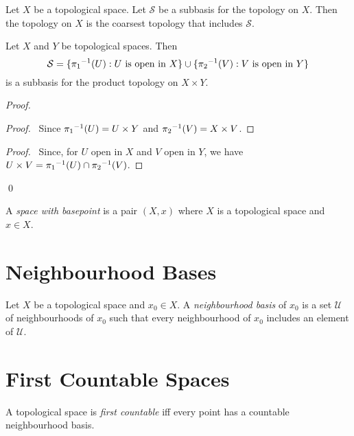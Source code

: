 \begin{prop}
Let $X$ be a topological space.
Let $\mathcal{S}$ be a subbasis for the topology on $X$.
Then the topology on $X$ is the coarsest topology that includes $\mathcal{S}$.
\end{prop}


\begin{prop}
Let $X$ and $Y$ be topological spaces. Then
\[ \mathcal{S} = \{ {\pi_1}^{-1}(U) : U \text{ is open in } X \} \cup \{ {\pi_2}^{-1}(V) : V \text{ is open in } Y \} \]
is a subbasis for the product topology on $X \times Y$.
\end{prop}

\begin{proof}
\pf
{}
\begin{proof}
	\pf\ Since ${\pi_1}^{-1}(U) = U \times Y$ and ${\pi_2}^{-1}(V) = X \times V$.
\end{proof}
\begin{proof}
	\pf\ Since, for $U$ open in $X$ and $V$ open in $Y$, we have $U \times V = {\pi_1}^{-1}(U) \cap {\pi_2}^{-1}(V)$.
\end{proof}
\qed
\end{proof}

\begin{df}
A \emph{space with basepoint} is a pair $(X,x)$ where $X$ is a topological space and $x \in X$.
\end{df}

\section{Neighbourhood Bases}

\begin{df}
Let $X$ be a topological space and $x_0 \in X$. A \emph{neighbourhood basis} of $x_0$ is a set $\mathcal{U}$ of neighbourhoods of $x_0$ such that every neighbourhood of $x_0$ includes an element of $\mathcal{U}$.
\end{df}

\section{First Countable Spaces}

\begin{df}
A topological space is \emph{first countable} iff every point has a countable neighbourhood basis.
\end{df}

